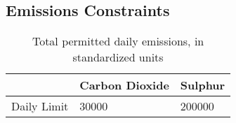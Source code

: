 \documentclass{article}
\begin{document}
    \subsection*{Emissions Constraints}

	\begin{table}[h]
    \centering
    \begin{tabular}{lll}
    	\hline
    	~ & Carbon Dioxide & Sulphur \\ \hline
    	Daily Limit & 30000 & 200000 \\ \hline
    \end{tabular}
    \caption{Total permitted daily emissions, in standardized units\label{Table 3}}
    \end{table}
\end{document}
